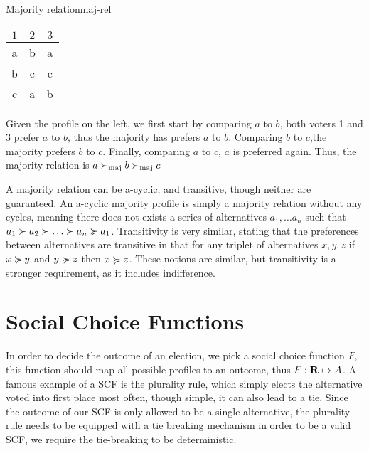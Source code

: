 \begin{example}{Majority relation}{maj-rel}
	\begin{minipage}{0.15\linewidth}
		\begin{tabular}{ccc}
			\toprule
			$1$ & $2$ & $3$ \\
			\midrule
			a   & b   & a   \\
			b   & c   & c   \\
			c   & a   & b   \\
			\bottomrule
		\end{tabular}
	\end{minipage}
	\hspace{0.02\linewidth}
	\begin{minipage}{0.78\linewidth}
		Given the profile on the left, we first start by comparing $a$ to $b$, both voters 1 and 3 prefer $a$ to $b$, thus the majority has prefers $a$ to $b$. Comparing $b$ to $c$,the majority prefers $b$ to $c$. Finally, comparing $a$ to $c$, $a$ is preferred again. Thus, the majority relation is $a \succ_{\textnormal{maj}} b \succ_{\textnormal{maj}} c$
	\end{minipage}
\end{example}

A majority relation can be a-cyclic, and transitive, though neither are guaranteed. An a-cyclic majority profile is simply a majority relation without any cycles, meaning there does not exists a series of alternatives $a_1, \dots a_n$ such that $a_1 \pref a_2 \pref \dots \pref a_n  \prefeq a_1$. Transitivity is very similar, stating that the preferences between alternatives are transitive in that for any triplet of alternatives $x,y,z$ if $x \succcurlyeq y$ and $y \succcurlyeq z$ then $x \succcurlyeq z$. These notions are similar, but transitivity is a stronger requirement, as it includes indifference.


\section{Social Choice Functions}
\label{sec:SCF}
In order to decide the outcome of an election, we pick a social choice function $F$, this function should map all possible profiles to an outcome, thus $F: \mathbf{R} \mapsto A$. A famous example of a SCF is the plurality rule, which simply elects the alternative voted into first place most often, though simple, it can also lead to a tie. Since the outcome of our SCF is only allowed to be a single alternative, the plurality rule needs to be equipped with a tie breaking mechanism in order to be a valid SCF, we require the tie-breaking to be deterministic. 


